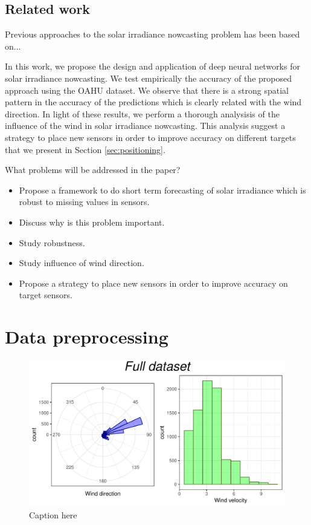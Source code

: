 \documentclass[preprints,article,accept,moreauthors,pdftex]{template/mdpi}
\begin{document}
\subsection{Related work}

Previous approaches to the solar irradiance nowcasting problem has been based on...


In this work, we propose the design and application of deep neural networks for solar irradiance nowcasting. We test empirically the accuracy of the proposed approach using the OAHU dataset. We observe that there is a strong spatial pattern in the accuracy of the predictions which is clearly related with the wind direction. In light of these results, we perform a thorough analysisis of the influence of the wind in solar irradiance nowcasting. This analysis suggest a strategy to place new sensors in order to improve accuracy on different targets that we present in Section \ref{sec:positioning}.


What problems will be addressed in the paper?
\begin{itemize}
    \item Propose a framework to do short term forecasting of solar irradiance which is robust to missing values in sensors. 
    \item Discuss why is this problem important.
    \item Study robustness.
    \item Study influence of wind direction.
    \item Propose a strategy to place new sensors in order to improve accuracy on target sensors.
\end{itemize}


\section{Data preprocessing}\label{sec:prep}

\begin{figure}
\centering
\includegraphics[width=\textwidth]{Clear_dataset.pdf}
\caption{Caption here}
\end{figure}
\end{document}

